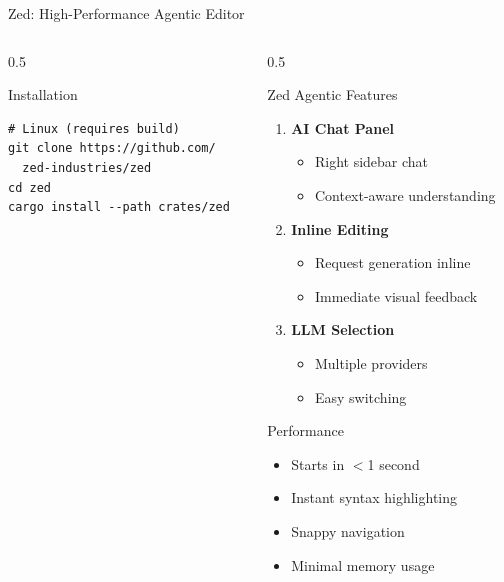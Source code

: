 \documentclass[aspectratio=169,11pt]{beamer}
\begin{document}
\begin{frame}[fragile]{Zed: High-Performance Agentic Editor}
\begin{columns}[T]
\begin{column}{0.5\textwidth}
\begin{block}{Installation}
\begin{lstlisting}[style=bash]
# Linux (requires build)
git clone https://github.com/
  zed-industries/zed
cd zed
cargo install --path crates/zed
                \end{lstlisting}
            \end{block}
        \end{column}
        \begin{column}{0.5\textwidth}
            \begin{block}{Zed Agentic Features}
                \begin{enumerate}
                    \item \textbf{AI Chat Panel}
                    \begin{itemize}
                        \item Right sidebar chat
                        \item Context-aware understanding
                    \end{itemize}
                    \item \textbf{Inline Editing}
                    \begin{itemize}
                        \item Request generation inline
                        \item Immediate visual feedback
                    \end{itemize}
                    \item \textbf{LLM Selection}
                    \begin{itemize}
                        \item Multiple providers
                        \item Easy switching
                    \end{itemize}
                \end{enumerate}
            \end{block}

            \begin{alertblock}{Performance}
                \begin{itemize}
                    \item Starts in $<$1 second
                    \item Instant syntax highlighting
                    \item Snappy navigation
                    \item Minimal memory usage
                \end{itemize}
            \end{alertblock}
        \end{column}
    \end{columns}

\end{frame}
\end{document}
